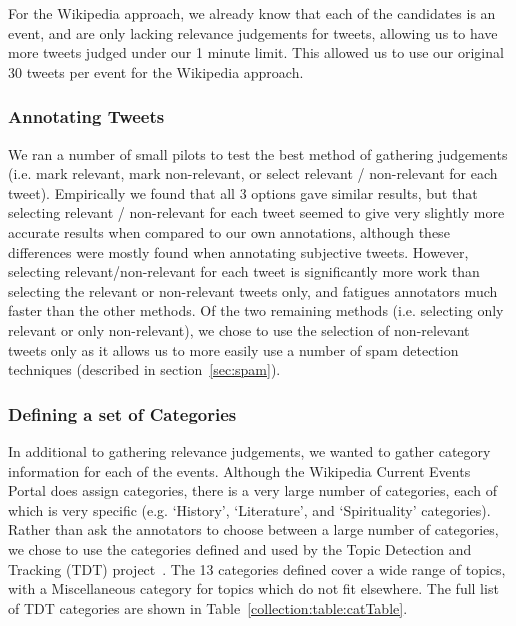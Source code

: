 For the Wikipedia approach, we already know that each of the candidates is an event, and are only lacking relevance judgements for tweets, allowing us to have more tweets judged under our 1 minute limit.
This allowed us to use our original 30 tweets per event for the Wikipedia approach.

\subsubsection{Annotating Tweets}
We ran a number of small pilots to test the best method of gathering judgements (i.e. mark relevant, mark non-relevant, or select relevant / non-relevant for each tweet).
Empirically we found that all 3 options gave similar results, but that selecting relevant / non-relevant for each tweet seemed to give very slightly more accurate results when compared to our own annotations, although these differences were mostly found when annotating subjective tweets.
However, selecting relevant/non-relevant for each tweet is significantly more work than selecting the relevant or non-relevant tweets only, and fatigues annotators much faster than the other methods.
Of the two remaining methods (i.e. selecting only relevant or only non-relevant), we chose to use the selection of non-relevant tweets only as it allows us to more easily use a number of spam detection techniques (described in section~\ref{sec:spam}).

\subsubsection{Defining a set of Categories}
In additional to gathering relevance judgements, we wanted to gather category information for each of the events.
Although the Wikipedia Current Events Portal does assign categories, there is a very large number of categories, each of which is very specific (e.g. `History', `Literature', and `Spirituality' categories).
Rather than ask the annotators to choose between a large number of categories, we chose to use the categories defined and used by the Topic Detection and Tracking (TDT) project~\cite{Allan:2002:ITD:772260.772262}.
The 13 categories defined cover a wide range of topics, with a Miscellaneous category for topics which do not fit elsewhere.
The full list of TDT categories are shown in Table~\ref{collection:table:catTable}.


